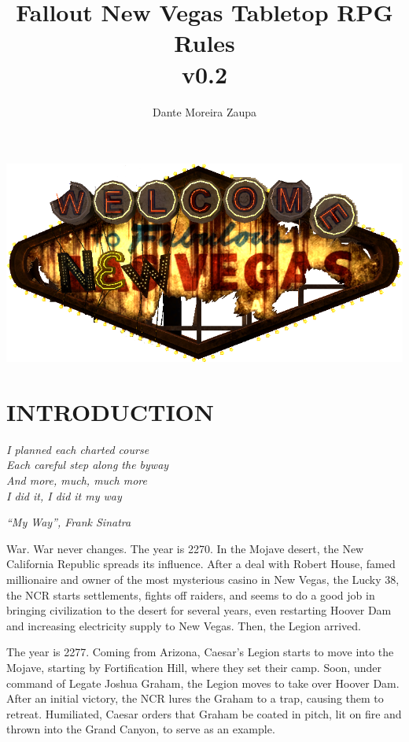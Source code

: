 \documentclass[11pt]{article} %
\title{Fallout New Vegas Tabletop RPG Rules\\v0.2}
\author{Dante Moreira Zaupa}
\begin{document}
\maketitle
\begin{center}
\includegraphics[scale=0.5]{logo_new_vegas.png}
\end{center}
\newpage
\tableofcontents
\newpage
\listoftables
\newpage


\section{INTRODUCTION}

\epigraph{\textit{I planned each charted course \\
Each careful step along the byway \\
And more, much, much more \\
I did it, I did it my way}}{\textit{``My Way'', Frank Sinatra}}

War. War never changes. The year is 2270. In the Mojave desert, the New California Republic spreads its influence. After a deal with Robert House, famed millionaire and owner of the most mysterious casino in New Vegas, the Lucky 38, the NCR starts settlements, fights off raiders, and seems to do a good job in bringing civilization to the desert for several years, even restarting Hoover Dam and increasing electricity supply to New Vegas. Then, the Legion arrived.

The year is 2277. Coming from Arizona, Caesar's Legion starts to move into the Mojave, starting by Fortification Hill, where they set their camp. Soon, under command of Legate Joshua Graham, the Legion moves to take over Hoover Dam. After an initial victory, the NCR lures the Graham to a trap, causing them to retreat. Humiliated, Caesar orders that Graham be coated in pitch, lit on fire and thrown into the Grand Canyon, to serve as an example. 
\end{document}
